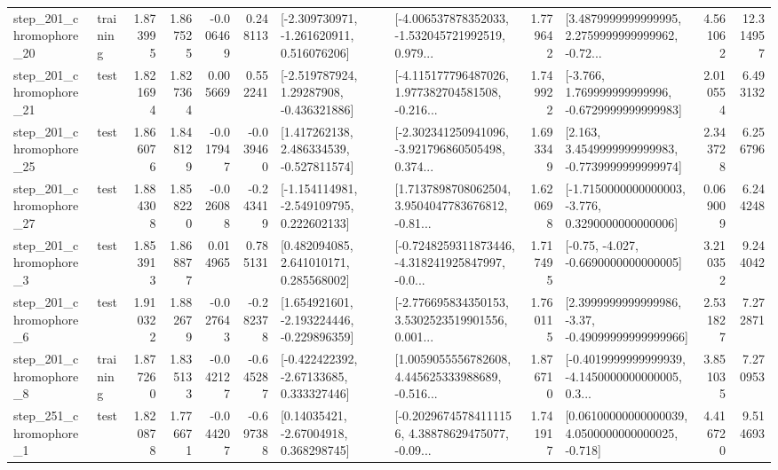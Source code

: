 \begin{tabular}{llrrrrllrlrr}
  step\_201\_chromophore\_20 &  training &      1.873995 &    1.867525 &     -0.006469 &  0.248113 &   [-2.309730971, -1.261620911, 0.516076206] &  [-4.006537878352033, -1.532045721992519, 0.979... &       1.779642 &  [3.4879999999999995, 2.2759999999999962, -0.72... &            4.561062 &         12.314957 \\
  step\_201\_chromophore\_21 &      test &      1.821694 &    1.827364 &      0.005669 &  0.552241 &    [-2.519787924, 1.29287908, -0.436321886] &  [-4.115177796487026, 1.977382704581508, -0.216... &       1.749922 &   [-3.766, 1.769999999999996, -0.6729999999999983] &            2.010554 &          6.493132 \\
  step\_201\_chromophore\_25 &      test &      1.866076 &    1.848129 &     -0.017947 & -0.039460 &    [1.417262138, 2.486334539, -0.527811574] &  [-2.302341250941096, -3.921796860505498, 0.374... &       1.693349 &   [2.163, 3.4549999999999983, -0.7739999999999974] &            2.343728 &          6.256796 \\
  step\_201\_chromophore\_27 &      test &      1.884308 &    1.858220 &     -0.026088 & -0.243419 &   [-1.154114981, -2.549109795, 0.222602133] &  [1.7137898708062504, 3.9504047783676812, -0.81... &       1.620698 &  [-1.7150000000000003, -3.776, 0.3290000000000006] &            0.069009 &          6.244248 \\
   step\_201\_chromophore\_3 &      test &      1.853913 &    1.868877 &      0.014965 &  0.785131 &     [0.482094085, 2.641010171, 0.285568002] &  [-0.7248259311873446, -4.318241925847997, -0.0... &       1.717495 &               [-0.75, -4.027, -0.6690000000000005] &            3.210352 &          9.244042 \\
   step\_201\_chromophore\_6 &      test &      1.910322 &    1.882679 &     -0.027643 & -0.282378 &   [1.654921601, -2.193224446, -0.229896359] &  [-2.776695834350153, 3.5302523519901556, 0.001... &       1.760115 &  [2.3999999999999986, -3.37, -0.49099999999999966] &            2.531827 &          7.272871 \\
   step\_201\_chromophore\_8 &  training &      1.877260 &    1.835133 &     -0.042127 & -0.645287 &    [-0.422422392, -2.67133685, 0.333327446] &  [1.0059055556782608, 4.445625333988689, -0.516... &       1.876710 &  [-0.4019999999999939, -4.1450000000000005, 0.3... &            3.851035 &          7.270953 \\
   step\_251\_chromophore\_1 &      test &      1.820878 &    1.776671 &     -0.044207 & -0.697388 &      [0.14035421, -2.67004918, 0.368298745] &  [-0.20296745784111156, 4.38878629475077, -0.09... &       1.741917 &  [0.06100000000000039, 4.0500000000000025, -0.718] &            4.416720 &          9.514693 \\

\end{tabular}
